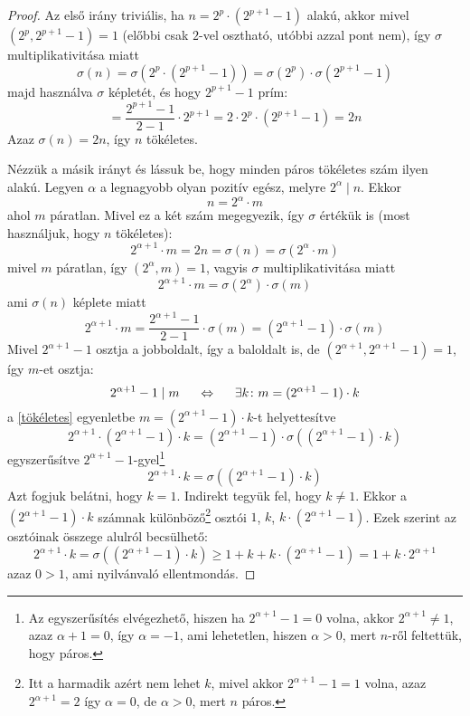 \documentclass[12pt]{book}
\theoremstyle{plain} %
\theoremstyle{definition} %
\theoremstyle{remark}
\numberwithin{equation}{section}  %
\begin{document}
	\begin{proof}
		Az első irány triviális, ha $n=2^p\cdot (2^{p+1}-1)$ alakú, akkor mivel $(2^p,2^{p+1}-1)=1$ (előbbi csak $2$-vel osztható, utóbbi azzal pont nem), így $\sigma$ multiplikativitása miatt
		\[ \sigma(n) = \sigma(2^p\cdot (2^{p+1} - 1)) = \sigma(2^p)\cdot \sigma(2^{p+1}-1)  \]
		majd használva $\sigma$ képletét, és hogy $2^{p+1}-1$ prím:
		\[ = \dfrac{2^{p+1}-1}{2-1} \cdot 2^{p+1} = 2\cdot 2^p \cdot (2^{p+1}-1) = 2n  \]
		Azaz $\sigma(n) = 2n$, így $n$ tökéletes.
		
		Nézzük a másik irányt és lássuk be, hogy minden páros tökéletes szám ilyen alakú. Legyen $\alpha$ a legnagyobb olyan pozitív egész, melyre $2^{\alpha}\mid n$. Ekkor
		\[ n = 2^{\alpha} \cdot m \]
		ahol $m$ páratlan. Mivel ez a két szám megegyezik, így $\sigma$ értékük is (most használjuk, hogy $n$ tökéletes):
		\[ 2^{\alpha+1}\cdot m = 2n = \sigma(n) = \sigma(2^{\alpha} \cdot m)  \]
		mivel $m$ páratlan, így $(2^\alpha, m) = 1$, vagyis $\sigma$ multiplikativitása miatt
		\[ 2^{\alpha+1}\cdot m = \sigma(2^{\alpha}) \cdot \sigma(m)  \]
		ami $\sigma(n)$ képlete miatt
		\begin{equation}\label{tökéletes}
			2^{\alpha+1}\cdot m = \dfrac{2^{\alpha+1} - 1}{2-1} \cdot \sigma(m) = (2^{\alpha+1}-1) \cdot \sigma(m) 
		\end{equation}
		Mivel $2^{\alpha+1} - 1$ osztja a jobboldalt, így a baloldalt is, de $(2^{\alpha+1},2^{\alpha+1}-1) = 1$, így $m$-et osztja:
		\[ 2^{\alpha+1}-1\mid m \hspace{5mm} \Leftrightarrow \hspace{5mm} \exists k\colon m = (2^{\alpha+1}-1)\cdot k  \]
		a \ref{tökéletes} egyenletbe $m=(2^{\alpha+1}-1)\cdot k$-t helyettesítve
		\[ 2^{\alpha+1}\cdot (2^{\alpha+1}-1)\cdot k   = (2^{\alpha+1}-1) \cdot \sigma\left((2^{\alpha+1}-1)\cdot k\right) \]
		egyszerűsítve $2^{\alpha+1}-1$-gyel\footnote{Az egyszerűsítés elvégezhető, hiszen ha $2^{\alpha+1}-1 = 0$ volna, akkor $2^{\alpha+1} \neq 1$, azaz $\alpha+1 = 0$, így $\alpha = -1$, ami lehetetlen, hiszen $\alpha > 0$, mert $n$-ről feltettük, hogy páros.}
		\begin{equation}\label{sigma}
			2^{\alpha+1} \cdot k = \sigma\left((2^{\alpha+1}-1)\cdot k\right)
		\end{equation}
		Azt fogjuk belátni, hogy $k=1$. Indirekt tegyük fel, hogy $k\neq 1$. Ekkor a $(2^{\alpha+1}-1)\cdot k$ számnak különböző\footnote{Itt a harmadik azért nem lehet $k$, mivel akkor $2^{\alpha+1}-1 = 1$ volna, azaz $2^{\alpha+1} = 2$ így $\alpha = 0$, de $\alpha > 0$, mert $n$ páros.} osztói $1$, $k$, $k\cdot(2^{\alpha+1}-1)$. Ezek szerint az osztóinak összege alulról becsülhető:
		\[ 2^{\alpha+1} \cdot k = \sigma\left( (2^{\alpha+1}-1)\cdot k \right) \geq 1+k+k\cdot (2^{\alpha+1}-1) = 1 + k\cdot 2^{\alpha+1}  \]
		azaz $0>1$, ami nyilvánvaló ellentmondás.
		

\end{proof}
\end{document}
